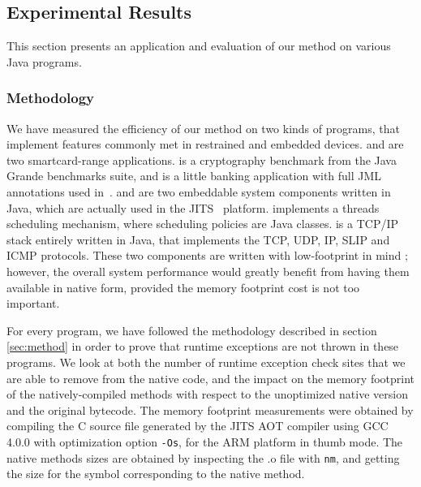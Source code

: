 \subsection{Experimental Results}
\label{sec:experiments}

This section presents an application and evaluation of our method on various Java programs.

\subsubsection{Methodology}

We have measured the efficiency of our method on two kinds of programs, that implement features commonly met in restrained and embedded devices.  and  are two smartcard-range applications.  is a cryptography benchmark from the Java Grande benchmarks suite, and  is a little banking application with full JML annotations used in~\cite{BRL-JACK}.  and  are two embeddable system components written in Java, which are actually used in the JITS~\cite{JITSWebsite} platform.  implements a threads scheduling mechanism, where scheduling policies are Java classes.  is a TCP/IP stack entirely written in Java, that implements the TCP, UDP, IP, SLIP and ICMP protocols. These two components are written with low-footprint in mind ; however, the overall system performance would greatly benefit from having them available in native form, provided the memory footprint cost is not too important.

For every program, we have followed the methodology described in section \ref{sec:method} in order to prove that runtime exceptions are not thrown in these programs. We look at both the number of runtime exception check sites that we are able to remove from the native code, and the impact on the memory footprint of the natively-compiled methods with respect to the unoptimized native version and the original bytecode. The memory footprint measurements were obtained by compiling the C source file generated by the JITS AOT compiler using GCC 4.0.0 with optimization option \texttt{-Os}, for the ARM platform in thumb mode. The native methods sizes are obtained by inspecting the .o file with \texttt{nm}, and getting the size for the symbol corresponding to the native method.

